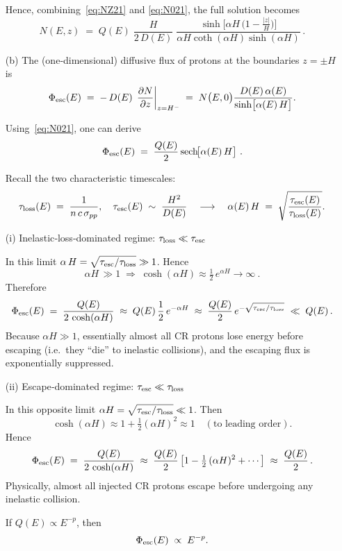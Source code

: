 \begin{solution}
\begin{itemize}
Hence, combining~\eqref{eq:NZ21} and \eqref{eq:N021}, the full solution becomes 
%
\begin{equation}
\boxed{
N(E,z) \;=\; Q(E) \; \frac{H}{2\,D(E)} \; 
\frac{\sinh\bigl[\alpha H \,\bigl(1 - \tfrac{\lvert z\rvert}{H})\bigr]}{\alpha H \coth(\alpha H) \sinh(\alpha H )}\,.
}
\end{equation}

\item[(b)] The (one‐dimensional) diffusive flux of protons at the boundaries \(z = \pm H\) is
\[
\Phi_{\rm esc}(E) \;=\; 
-\,D(E)\,\left.\frac{\partial N}{\partial z}\right\lvert_{z=H^{-}}
\;=\; 
N\bigl(E,0\bigr) \frac{D(E)\,\alpha(E)}{\sinh\bigl[\alpha(E)\,H\bigr]}.
\]

Using~\eqref{eq:N021}, one can derive
\[
\Phi_{\rm esc}(E) \;=\; \frac{Q(E)}{2}\,\mathrm{sech}\!\bigl[\alpha(E)\,H\bigr]~.
\]

Recall the two characteristic timescales:
\[
\tau_{\rm loss}(E) 
\;=\; \frac{1}{n\,c\,\sigma_{pp}}, 
\quad
\tau_{\rm esc}(E) 
\;\sim\; \frac{H^2}{D(E)}
\quad
\longrightarrow 
\quad
\alpha(E)\,H 
\;=\; \sqrt{\frac{\tau_{\rm esc}(E)}{\tau_{\rm loss}(E)}}.
\]

(i) Inelastic‐loss‐dominated regime: \(\tau_{\rm loss} \ll \tau_{\rm esc}\)

In this limit \(\alpha\,H = \sqrt{\tau_{\rm esc}/\tau_{\rm loss}} \gg 1\).  
%
Hence
\[
\alpha H \,\gg 1 
\;\Longrightarrow\; 
\cosh(\alpha H) \approx \tfrac{1}{2}\,e^{\alpha H} \rightarrow \infty~.
\]
%
Therefore
\[
\Phi_{\rm esc}(E) 
\;=\; \frac{Q(E)}{2\,\cosh(\alpha H)}
\;\approx\; Q(E)\,\frac{1}{2}\,e^{-\alpha H}
\;\approx\; \frac{Q(E)}{2}\,e^{-\sqrt{\tau_{\rm esc}/\tau_{\rm loss}}}\;\ll\;Q(E)\,. 
\]
Because \(\alpha H \gg 1\), essentially almost all CR protons lose energy before escaping (i.e.\ they “die” to inelastic collisions), and the escaping flux is exponentially suppressed.

(ii) Escape‐dominated regime: \(\tau_{\rm esc} \ll \tau_{\rm loss}\)

In this opposite limit \(\alpha H = \sqrt{\tau_{\rm esc}/\tau_{\rm loss}} \ll 1\).  
%
Then
\[
\cosh(\alpha H)\approx 1 + \tfrac{1}{2}(\alpha H)^2\approx 1 
\quad(\text{to leading order}).
\]
Hence
\[
\Phi_{\rm esc}(E) \;=\; \frac{Q(E)}{2\,\cosh(\alpha H)} 
\;\approx\; \frac{Q(E)}{2}\,\bigl[1 - \tfrac12\,(\alpha H)^2 + \cdots\bigr]
\;\approx\; \frac{Q(E)}{2}\,.
\]
Physically, almost all injected CR protons escape before undergoing any inelastic collision.  

If \(Q(E)\propto E^{-p}\), then 
\[
\Phi_{\rm esc}(E)\;\propto\; E^{-p}.
\]


\end{itemize}
\end{solution}
